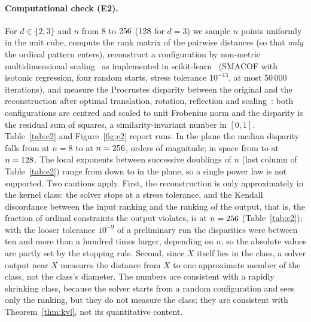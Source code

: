 \documentclass[11pt,a4paper]{article}
\theoremstyle{plain}
\theoremstyle{definition}
\theoremstyle{remark}
\begin{document}
\paragraph{Computational check (E2).}
For $d\in\{2,3\}$ and $n$ from $8$ to $256$ ($128$ for $d=3$) we sample $n$ points uniformly in the unit cube, compute the rank matrix of the pairwise distances (so that \emph{only} the ordinal pattern enters), reconstruct a configuration by non-metric multidimensional scaling~\citep{shepard1962,kruskal1964} as implemented in scikit-learn~\citep{pedregosa2011} (SMACOF with isotonic regression, four random starts, stress tolerance $10^{-13}$, at most $50\,000$ iterations), and measure the Procrustes disparity between the original and the reconstruction after optimal translation, rotation, reflection and scaling~\citep{schonemann1966,gower1975}: both configurations are centred and scaled to unit Frobenius norm and the disparity is the residual sum of squares, a similarity-invariant number in $[0,1]$. Table~\ref{tab:e2} and Figure~\ref{fig:e2} report \EtwoTotalRuns{} runs. In the plane the median disparity falls from \EtwoMedDtwoFirst{} at $n=8$ to \EtwoMedDtwoLast{} at $n=256$, \EtwoDropDtwo{} orders of magnitude; in space from \EtwoMedDthreeFirst{} to \EtwoMedDthreeLast{} at $n=128$. The local exponents between successive doublings of $n$ (last column of Table~\ref{tab:e2}) range from \EtwoLocMaxDtwo{} down to \EtwoLocMinDtwo{} in the plane, so a single power law is not supported. Two cautions apply. First, the reconstruction is only approximately in the kernel class: the solver stops at a stress tolerance, and the Kendall discordance between the input ranking and the ranking of the output, that is, the fraction of ordinal constraints the output violates, is \EtwoDiscDtwoLast{} at $n=256$ (Table~\ref{tab:e2}); with the looser tolerance $10^{-9}$ of a preliminary run the disparities were between ten and more than a hundred times larger, depending on $n$, so the absolute values are partly set by the stopping rule. Second, since $X$ itself lies in the class, a solver output near $X$ measures the distance from $X$ to one approximate member of the class, not the class's diameter. The numbers are consistent with a rapidly shrinking class, because the solver starts from a random configuration and sees only the ranking, but they do not measure the class; they are consistent with Theorem~\ref{thm:kvl}, not its quantitative content.
\end{document}
